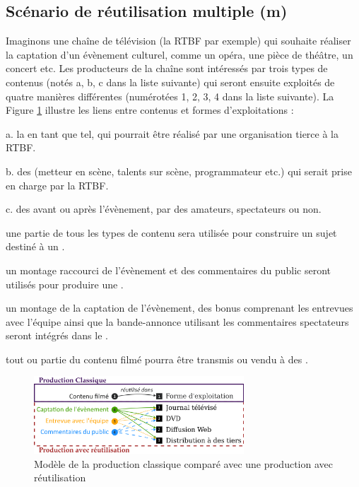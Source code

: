 \subsection{Scénario de réutilisation multiple (m)}\label{sec:ex-reuse}
Imaginons une chaîne de télévision (la RTBF par exemple) qui souhaite réaliser la captation d'un évènement culturel, comme un opéra, une pièce de théâtre, un concert etc. 
Les producteurs de la chaîne sont intéressés par trois types de contenus (notés a, b, c dans la liste suivante) qui seront ensuite exploités de quatre manières différentes (numérotées 1, 2, 3, 4 dans la liste suivante).
La Figure \ref{img:intro:reuse} illustre les liens entre contenus et formes d'exploitations :
\begin{listenum}
	\item[a.] la  en tant que tel, qui pourrait être réalisé par une organisation tierce à la RTBF.
	\item[b.] des  (metteur en scène, talents sur scène, programmateur etc.) qui serait prise en charge par la RTBF. 
	\item[c.] des  avant ou après l'évènement, par des amateurs, spectateurs ou non.\\

	\item une partie de tous les types de contenu sera utilisée pour construire un sujet destiné à un . 
	\item un montage raccourci de l'évènement et des commentaires du public seront utilisés pour produire une .
	\item un montage de la captation de l'évènement, des bonus comprenant les entrevues avec l'équipe ainsi que la bande-annonce utilisant les commentaires spectateurs seront intégrés dans le .	 
	\item tout ou partie du contenu filmé pourra être transmis ou vendu à des . 
\end{listenum}

\begin{figure}[ht!]
\centering
\includegraphics[width=0.7\textwidth]{images/UC-Tahnhauser-v1fr.png}
\caption{Modèle de la production classique comparé avec une production avec réutilisation}
\label{img:intro:reuse}
\end{figure}

